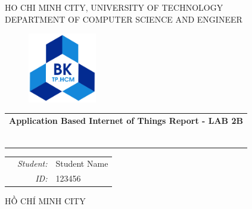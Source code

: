 \documentclass[a4paper,11pt]{article}
\theoremstyle{mytheor}
\begin{document}
\begin{titlepage}
\begin{center}
HO CHI MINH CITY, UNIVERSITY OF TECHNOLOGY \\
DEPARTMENT OF COMPUTER SCIENCE AND ENGINEER
\end{center}

\vspace{1cm}

\begin{figure}[h!]
\begin{center}
\includegraphics[width=3cm]{hcmut.png}
\end{center}
\end{figure}

\vspace{2cm}


\begin{center}
\begin{tabular}{c}
\multicolumn{1}{c}{\textbf{{\Large Application Based Internet of Things Report - LAB 2B}}}



~~\\

\\
\multicolumn{1}{l}{\textbf{{\Large}}}\\
\\
\textbf{{\Large}}\\

\\
\\

\end{tabular}
\end{center}

\vspace{3cm}

\begin{table}[h]
\begin{tabular}{rrl}
\hspace{5.1cm} 
&\textit{Student: } & Student Name\\
&\textit{ID: } & 123456 \\

\end{tabular}
\end{table}
\vspace{3cm}
\begin{center}
{\footnotesize HỒ CHÍ MINH CITY}
\end{center}
\end{titlepage}
\end{document}
